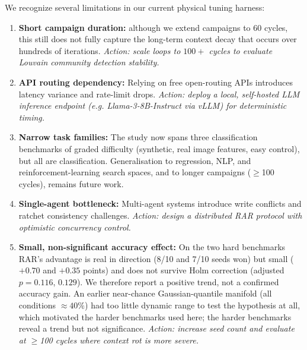 \documentclass[conference]{IEEEtran}
\begin{document}
We recognize several limitations in our current physical tuning harness:
\begin{enumerate}[label=\textbf{L\arabic*.},leftmargin=2.2em,itemsep=3pt]
  \item \textbf{Short campaign duration:} although we extend campaigns to 60 cycles, this still does not fully capture the long-term context decay that occurs over hundreds of iterations. \textit{Action: scale loops to $100+$ cycles to evaluate Louvain community detection stability.}
  \item \textbf{API routing dependency:} Relying on free open-routing APIs introduces latency variance and rate-limit drops. \textit{Action: deploy a local, self-hosted LLM inference endpoint (e.g. Llama-3-8B-Instruct via vLLM) for deterministic timing.}
  \item \textbf{Narrow task families:} The study now spans three classification benchmarks of graded difficulty (synthetic, real image features, easy control), but all are classification. Generalisation to regression, NLP, and reinforcement-learning search spaces, and to longer campaigns ($\geq$100 cycles), remains future work.
  \item \textbf{Single-agent bottleneck:} Multi-agent systems introduce write conflicts and ratchet consistency challenges. \textit{Action: design a distributed RAR protocol with optimistic concurrency control.}
  \item \textbf{Small, non-significant accuracy effect:} On the two hard benchmarks RAR's advantage is real in direction (8/10 and 7/10 seeds won) but small ($+0.70$ and $+0.35$ points) and does not survive Holm correction (adjusted $p = 0.116$, $0.129$). We therefore report a positive trend, not a confirmed accuracy gain. An earlier near-chance Gaussian-quantile manifold (all conditions $\approx 40\%$) had too little dynamic range to test the hypothesis at all, which motivated the harder benchmarks used here; the harder benchmarks reveal a trend but not significance. \textit{Action: increase seed count and evaluate at $\geq$100 cycles where context rot is more severe.}

\end{enumerate}
\end{document}
